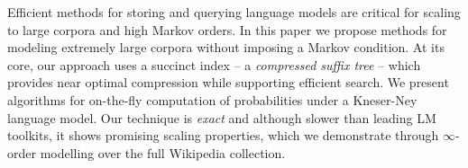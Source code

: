 Efficient methods for storing and querying language models are critical for scaling to large corpora and high Markov orders.
In this paper we propose methods for modeling extremely large corpora without
imposing a Markov condition.
At its core, our approach uses a succinct index -- a \emph{compressed suffix tree} -- which provides near optimal compression while supporting efficient search.
We present algorithms for on-the-fly computation of probabilities under a
Kneser-Ney language model.
Our technique is \emph{exact} and although slower than leading LM
toolkits, it shows promising scaling properties,
which we demonstrate through $\infty$-order modelling over the full Wikipedia collection. 


